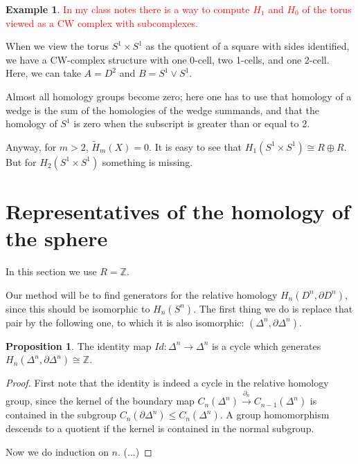 \documentclass{book}
\theoremstyle{definition}
\newtheorem*{prop}{Proposition}
\newtheorem*{ejem}{Example}
\newcommand{\Z}{\mathbb{Z}}
\begin{document}
\begin{ejem}\label{ejem:toroCWMV}
\textcolor{red}{In my class notes there is a way to compute
$H_1$ and $H_0$ of the torus viewed as a CW complex with
subcomplexes.}

When we view the torus $S^1\times S^1$ as the quotient of a
square with sides identified, we have a CW-complex structure
with one 0-cell, two 1-cells, and one 2-cell. Here, we can
take $A=D^2$ and $B=S^1\vee S^1$.

Almost all homology groups become zero; here one has to use that
homology of a wedge is the sum of the homologies of the
wedge summands, and that the homology of $S^1$ is zero when
the subscript is greater than or equal to 2.

Anyway, for $m>2$, $\tilde H_m(X)=0$. It is easy to see that
$H_1(S^1\times S^1)\cong R\oplus R$. But for
$H_2(S^1\times S^1)$ something is missing.
\end{ejem}

\section{Representatives of the homology of the sphere}

In this section we use $R=\mathbb Z$.

Our method will be to find generators for the relative
homology $H_n(D^n,\partial D^n)$, since this should be
isomorphic to $H_n(S^n)$. The first thing we do is replace
that pair by the following one, to which it is also
isomorphic: $(\Delta^n,\partial\Delta^n)$.

\begin{prop}
The identity map $Id:\Delta^n\to\Delta^n$ is a cycle which
generates $H_n(\Delta^n,\partial\Delta^n)\cong\Z$.
\begin{proof}
First note that the identity is indeed a cycle in the
relative homology group, since the kernel of the boundary map
$C_n(\Delta^n)\xrightarrow{\partial_n}C_{n-1}(\Delta^n)$ is
contained in the subgroup
$C_n(\partial\Delta^n)\leq C_n(\Delta^n)$. A group
homomorphism descends to a quotient if the kernel is contained
in the normal subgroup.

Now we do induction on $n$. (...)

\end{proof}
\end{prop}
\end{document}
